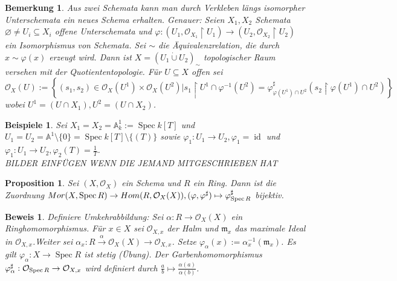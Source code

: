 \documentclass[a4paper,oneside]{scrbook}
\theoremstyle{break}
\newtheorem{Bem}[Def]{Bemerkung}
\newtheorem{Prop}[Def]{Proposition}
\newtheorem{Bsp}[Def]{Beispiele}
\theoremstyle{nonumberbreak}
\theoremstyle{nonumberplain}
\newtheorem{Bew}{Beweis}
\theoremstyle{break}
\renewcommand{\emptyset}{%
	\ensuremath{\varnothing}%
}
\newcommand{\Spec}{%
	\ensuremath{\operatorname{Spec}}%
}
\DeclareMathOperator{\id}{id}
\begin{document}
\begin{Bem}
	Aus zwei Schemata kann man durch Verkleben längs isomorpher Unterschemata ein neues Schema erhalten.
	Genauer: Seien $X_1,X_2$ Schemata $\emptyset \neq U_i \subseteq X_i$ offene Unterschemata und $\varphi: \left( U_1, \mathcal{O}_{X_1} \restriction U_1 \right) \rightarrow \left( U_2, \mathcal{O}_{X_2} \restriction U_2 \right)$ ein Isomorphismus von Schemata. Sei $\sim$ die Äquivalenzrelation, die durch $x \sim \varphi (x)$ erzeugt wird. Dann ist $X=(U_1 \dot\cup U_2)_\sim $ topologischer Raum versehen mit der Quotiententopologie. Für $U \subseteq X$ offen sei $\mathcal{O}_X(U):=\left\lbrace  (s_1,s_2) \in \mathcal{O}_X(U^1) \times \mathcal{O}_X(U^2) | s_1 \restriction U^1 \cap \varphi^{-1}(U^2) = \varphi^\sharp_{\varphi(U^1) \cap U^2}(s_2 \restriction \varphi(U^1) \cap U^2) \right\rbrace$ wobei $U^1=(U \cap X_1), U^2=(U \cap X_2)$.
\end{Bem}

\begin{Bsp}
 Sei $X_1 = X_2 = \mathbb{A}^1_k:=\Spec k[T]$ und 
 $U_1=U_2=\mathbb{A}^1 \setminus \{0\} = \Spec k[T] \setminus \{(T)\}$ sowie $\varphi_1 : U_1 \rightarrow U_2, \varphi_1 = \id$ und $\varphi_1: U_1 \rightarrow U_2, \varphi_2(T) = \frac{1}{T} $.\\ BILDER EINFÜGEN WENN DIE JEMAND MITGESCHRIEBEN HAT
\end{Bsp}

\begin{Prop}
\label{prop:3.7}
	Sei $\left(X, \mathcal{O}_X \right)$ ein Schema und $R$ ein Ring. Dann ist die Zuordnung $Mor(X, \Spec R) \rightarrow Hom(R, \mathcal{O}_X(X)), (\varphi, \varphi^\sharp) \mapsto \varphi^\sharp_{\Spec R}$ bijektiv.
\end{Prop}
\begin{Bew}
	Definiere Umkehrabbildung: Sei $\alpha : R \rightarrow \mathcal{O}_X(X)$ ein Ringhomomorphismus. Für $x \in X$ sei $\mathcal{O}_{X,x}$ der Halm und $\mathfrak{m}_x$ das maximale Ideal in $\mathcal{O}_{X,x}$.Weiter sei $\alpha_x: R \stackrel{\alpha}\rightarrow \mathcal{O}_{X}(X) \rightarrow \mathcal{O}_{X,x}$. Setze $\varphi_\alpha(x):=\alpha^{-1}_x(\mathfrak{m}_x)$. Es gilt $\varphi_\alpha : X \rightarrow \Spec R $ ist stetig (Übung). Der Garbenhomomorphismus $\varphi_\alpha^\sharp : \mathcal{O}_{\Spec R} \rightarrow \mathcal{O}_{X,x}$ wird definiert durch $\frac{a}{b} \mapsto \frac{\alpha(a)}{\alpha(b)}$.
\end{Bew}
\end{document}
